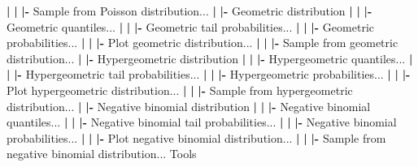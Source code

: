 \documentclass[12pt,]{krantz}
\newenvironment{Shaded}{\begin{snugshade}}{\end{snugshade}}
\newcommand{\ErrorTok}[1]{\textcolor[rgb]{0.64,0.00,0.00}{\textbf{#1}}}
\newcommand{\NormalTok}[1]{#1}
\newcommand{\OperatorTok}[1]{\textcolor[rgb]{0.81,0.36,0.00}{\textbf{#1}}}
\newcommand{\StringTok}[1]{\textcolor[rgb]{0.31,0.60,0.02}{#1}}
\begin{document}
\begin{Shaded}
\begin{Highlighting}[]
  \OperatorTok{|}\StringTok{ }\ErrorTok{|}\StringTok{ }\ErrorTok{|}\OperatorTok{-}\StringTok{ }\NormalTok{Sample from Poisson distribution...}
  \OperatorTok{|}\StringTok{ }\ErrorTok{|}\OperatorTok{-}\StringTok{ }\NormalTok{Geometric distribution}
  \OperatorTok{|}\StringTok{ }\ErrorTok{|}\StringTok{ }\ErrorTok{|}\OperatorTok{-}\StringTok{ }\NormalTok{Geometric quantiles...}
  \OperatorTok{|}\StringTok{ }\ErrorTok{|}\StringTok{ }\ErrorTok{|}\OperatorTok{-}\StringTok{ }\NormalTok{Geometric tail probabilities...}
  \OperatorTok{|}\StringTok{ }\ErrorTok{|}\StringTok{ }\ErrorTok{|}\OperatorTok{-}\StringTok{ }\NormalTok{Geometric probabilities...}
  \OperatorTok{|}\StringTok{ }\ErrorTok{|}\StringTok{ }\ErrorTok{|}\OperatorTok{-}\StringTok{ }\NormalTok{Plot geometric distribution...}
  \OperatorTok{|}\StringTok{ }\ErrorTok{|}\StringTok{ }\ErrorTok{|}\OperatorTok{-}\StringTok{ }\NormalTok{Sample from geometric distribution...}
  \OperatorTok{|}\StringTok{ }\ErrorTok{|}\OperatorTok{-}\StringTok{ }\NormalTok{Hypergeometric distribution}
  \OperatorTok{|}\StringTok{ }\ErrorTok{|}\StringTok{ }\ErrorTok{|}\OperatorTok{-}\StringTok{ }\NormalTok{Hypergeometric quantiles...}
  \OperatorTok{|}\StringTok{ }\ErrorTok{|}\StringTok{ }\ErrorTok{|}\OperatorTok{-}\StringTok{ }\NormalTok{Hypergeometric tail probabilities...}
  \OperatorTok{|}\StringTok{ }\ErrorTok{|}\StringTok{ }\ErrorTok{|}\OperatorTok{-}\StringTok{ }\NormalTok{Hypergeometric probabilities...}
  \OperatorTok{|}\StringTok{ }\ErrorTok{|}\StringTok{ }\ErrorTok{|}\OperatorTok{-}\StringTok{ }\NormalTok{Plot hypergeometric distribution...}
  \OperatorTok{|}\StringTok{ }\ErrorTok{|}\StringTok{ }\ErrorTok{|}\OperatorTok{-}\StringTok{ }\NormalTok{Sample from hypergeometric distribution...}
  \OperatorTok{|}\StringTok{ }\ErrorTok{|}\OperatorTok{-}\StringTok{ }\NormalTok{Negative binomial distribution}
  \OperatorTok{|}\StringTok{ }\ErrorTok{|}\StringTok{ }\ErrorTok{|}\OperatorTok{-}\StringTok{ }\NormalTok{Negative binomial quantiles...}
  \OperatorTok{|}\StringTok{ }\ErrorTok{|}\StringTok{ }\ErrorTok{|}\OperatorTok{-}\StringTok{ }\NormalTok{Negative binomial tail probabilities...}
  \OperatorTok{|}\StringTok{ }\ErrorTok{|}\StringTok{ }\ErrorTok{|}\OperatorTok{-}\StringTok{ }\NormalTok{Negative binomial probabilities...}
  \OperatorTok{|}\StringTok{ }\ErrorTok{|}\StringTok{ }\ErrorTok{|}\OperatorTok{-}\StringTok{ }\NormalTok{Plot negative binomial distribution...}
  \OperatorTok{|}\StringTok{ }\ErrorTok{|}\StringTok{ }\ErrorTok{|}\OperatorTok{-}\StringTok{ }\NormalTok{Sample from negative binomial distribution...}
\NormalTok{Tools}

\end{Highlighting}
\end{Shaded}
\end{document}
